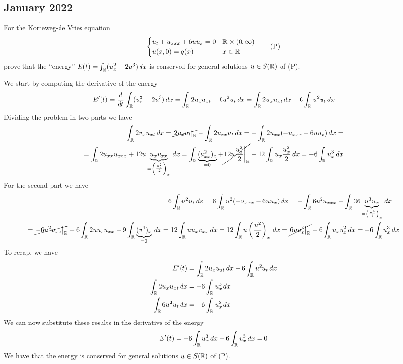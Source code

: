 \subsection{January 2022}
\begin{exercise}
    For the Korteweg-de Vries equation
    \[
        \begin{cases}
            u_t + u_{xxx} + 6 u u_x = 0 & \mathbb{R} \times (0, \infty) \\
            u(x, 0) = g(x) & x \in \mathbb{R}
        \end{cases}
        \tag*{(P)}
    \]
    prove that the ``energy'' \(E(t) = \int_{\mathbb{R}} (u_x^2 - 2 u^3) \, dx\) is conserved for general solutions \(u \in S(\mathbb{R})\) of (P).
\end{exercise}
We start by computing the derivative of the energy
\[
    \begin{split}
        E'(t) = \frac{d}{dt} \int_{\mathbb{R}} (u_x^2 - 2 u^3) \, dx = \int_{\mathbb{R}} 2 u_x u_{xt} - 6 u^2 u_t \, dx = \int_{\mathbb{R}} 2 u_x u_{xt} \, dx - 6 \int_{\mathbb{R}} u^2 u_t \, dx
    \end{split}
\]
Dividing the problem in two parts we have
\[
    \begin{split}
        \int_{\mathbb{R}} 2 u_x u_{xt} \, dx = \cancel{\left.2 u_x u_t \right|_{\mathbb{R}}} - \int_{\mathbb{R}} 2u_{xx} u_t \, dx = - \int_{\mathbb{R}} 2u_{xx} ( - u_{xxx} - 6 u u_x) \, dx = \\
        = \int_{\mathbb{R}} 2u_{xx} u_{xxx} + 12 u \underbrace{u_x u_{xx}}_{=\left(\frac{u_x^2}{2}\right)_x} \, dx = \int_{\mathbb{R}} \underbrace{(u_{xx}^2)_x}_{=0} + \cancel{\left. 12 u \frac{u_x^2}{2} \right|_{\mathbb{R}}} - 12 \int_{\mathbb{R}} u_x \frac{u_x^2}{2} \, dx = - 6 \int_{\mathbb{R}} u_x^3 \, dx
    \end{split}
\]
For the second part we have
\[
    \begin{split}
        6 \int_{\mathbb{R}} u^2 u_t \, dx = 6 \int_{\mathbb{R}} u^2 (-u_{xxx} - 6 u u_x) \, dx = -\int_{\mathbb{R}} 6 u^2 u_{xxx} - \int_{\mathbb{R}} 36 \underbrace{u^3 u_x}_{=\left(\frac{u^4}{4}\right)_x} \, dx = \\ 
        = \cancel{\left. - 6 u^2 u_{xx} \right|_{\mathbb{R}}} + 6 \int_{\mathbb{R}} 2 u u_{x} u_{xx} - 9 \int_{\mathbb{R}} \underbrace{(u^4)_x}_{=0} \, dx = 12 \int_{\mathbb{R}} u u_x u_{xx} \, dx = 12 \int_{\mathbb{R}} u\left(\frac{u^2}{2}\right)_x \, dx = \cancel{\left. 6 u u_x^2 \right|_{\mathbb{R}}} - 6 \int_{\mathbb{R}} u_x u^2_x \, dx = - 6 \int_{\mathbb{R}} u_x^3 \, dx
    \end{split}
\]
To recap, we have
\begin{align*}
    E'(t) &= \int_{\mathbb{R}} 2 u_x u_{xt} \, dx - 6 \int_{\mathbb{R}} u^2 u_t \, dx  \\
    \int_{\mathbb{R}} 2 u_x u_{xt} \, dx &= - 6 \int_{\mathbb{R}} u_x^3 \, dx \\
    \int_{\mathbb{R}} 6 u^2 u_t \, dx &= - 6 \int_{\mathbb{R}} u_x^3 \, dx
\end{align*} 
We can now substitute these results in the derivative of the energy
\[
    \begin{split}
        E'(t) = - 6 \int_{\mathbb{R}} u_x^3 \, dx + 6 \int_{\mathbb{R}} u_x^3 \, dx = 0
    \end{split}
\]
We have that the energy is conserved for general solutions \(u \in S(\mathbb{R})\) of (P).

